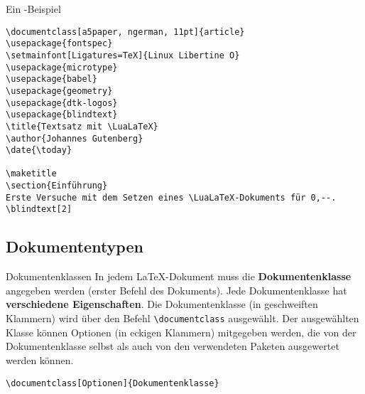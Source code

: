 \begin{frame}[fragile]{Ein \LuaLaTeX{}-Beispiel}
\begin{lstlisting}[style=tex]
%% Ein lualatex-Beispiel
\documentclass[a5paper, ngerman, 11pt]{article}
\usepackage{fontspec}
\setmainfont[Ligatures=TeX]{Linux Libertine O}
\usepackage{microtype}
\usepackage{babel}
\usepackage{geometry}
\usepackage{dtk-logos}
\usepackage{blindtext}
\title{Textsatz mit \LuaLaTeX}
\author{Johannes Gutenberg}
\date{\today}

\maketitle
\section{Einführung}
Erste Versuche mit dem Setzen eines \LuaLaTeX-Dokuments für 0,--.
\blindtext[2]

\end{lstlisting}
\end{frame}

\subsection{Dokumententypen}

\begin{frame}[fragile]{Dokumentenklassen}
In jedem \LaTeX{}-Dokument muss die \textbf{Dokumentenklasse} angegeben werden (erster Befehl des Dokuments). Jede Dokumentenklasse hat \textbf{verschiedene Eigenschaften}. Die Dokumentenklasse (in geschweiften Klammern) wird über den Befehl \texttt{\textbackslash documentclass} ausgewählt. Der ausgewählten Klasse können Optionen (in eckigen Klammern) mitgegeben werden, die von der Dokumentenklasse selbst als auch von den verwendeten Paketen ausgewertet werden können.
\begin{lstlisting}[style=tex]
\documentclass[Optionen]{Dokumentenklasse}
\end{lstlisting}
\end{frame}

